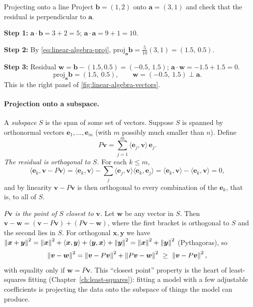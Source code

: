 \begin{sample}{Projecting onto a line}
Project $\bm b=(1,2)$ onto $\bm a=(3,1)$ and check that the residual is perpendicular to $\bm a$.

\textbf{Step 1:} $\bm a\cdot\bm b=3+2=5$; $\bm a\cdot\bm a=9+1=10$.

\textbf{Step 2:} By \cref{eq:linear-algebra-proj}, $\mathrm{proj}_{\bm a}\bm b=\tfrac{5}{10}(3,1)=(1.5,\,0.5)$.

\textbf{Step 3:} Residual $\bm w=\bm b-(1.5,0.5)=(-0.5,\,1.5)$; $\bm a\cdot\bm w=-1.5+1.5=0$.
\[
\boxed{\mathrm{proj}_{\bm a}\bm b=(1.5,\ 0.5),\qquad \bm w=(-0.5,\ 1.5)\perp\bm a.}
\]
This is the right panel of \cref{fig:linear-algebra-vectors}.
\end{sample}

\paragraph{Projection onto a subspace.} A \emph{subspace} $S$ is the span of some set of vectors. Suppose $S$ is spanned by orthonormal vectors $\bm e_1,\dots,\bm e_m$ (with $m$ possibly much smaller than $n$). Define
\begin{equation}
P\bm v=\sum_{j=1}^m\langle\bm e_j,\bm v\rangle\,\bm e_j .
\label{eq:linear-algebra-projsub}
\end{equation}
\emph{The residual is orthogonal to $S$.} For each $k\le m$,
\[
\langle\bm e_k,\bm v-P\bm v\rangle=\langle\bm e_k,\bm v\rangle-\sum_j\langle\bm e_j,\bm v\rangle\langle\bm e_k,\bm e_j\rangle=\langle\bm e_k,\bm v\rangle-\langle\bm e_k,\bm v\rangle=0,
\]
and by linearity $\bm v-P\bm v$ is then orthogonal to every combination of the $\bm e_k$, that is, to all of $S$.

\emph{$P\bm v$ is the point of $S$ closest to $\bm v$.} Let $\bm w$ be any vector in $S$. Then $\bm v-\bm w=(\bm v-P\bm v)+(P\bm v-\bm w)$, where the first bracket is orthogonal to $S$ and the second lies in $S$. For orthogonal $\bm x,\bm y$ we have $\left\lVert \bm x+\bm y\right\rVert^2=\left\lVert \bm x\right\rVert^2+\langle\bm x,\bm y\rangle+\langle\bm y,\bm x\rangle+\left\lVert \bm y\right\rVert^2=\left\lVert \bm x\right\rVert^2+\left\lVert \bm y\right\rVert^2$ (Pythagoras), so
\begin{equation}
\left\lVert \bm v-\bm w\right\rVert^2=\left\lVert \bm v-P\bm v\right\rVert^2+\left\lVert P\bm v-\bm w\right\rVert^2\ \ge\ \left\lVert \bm v-P\bm v\right\rVert^2 ,
\label{eq:linear-algebra-closest}
\end{equation}
with equality only if $\bm w=P\bm v$. This ``closest point'' property is the heart of least-squares fitting (Chapter~\ref{ch:least-squares}): fitting a model with a few adjustable coefficients is projecting the data onto the subspace of things the model can produce.

